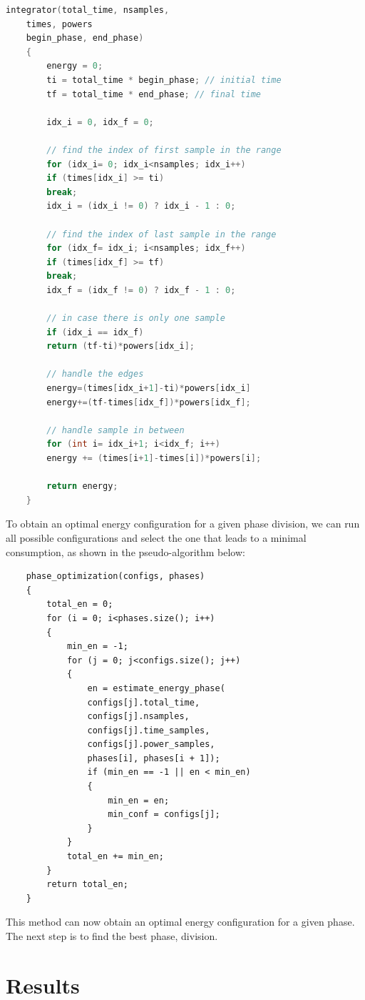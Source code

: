 \begin{lstlisting}[language=c++]
	integrator(total_time, nsamples,
	times, powers
	begin_phase, end_phase)
	{
		energy = 0;
		ti = total_time * begin_phase; // initial time
		tf = total_time * end_phase; // final time
		
		idx_i = 0, idx_f = 0;
		
		// find the index of first sample in the range
		for (idx_i= 0; idx_i<nsamples; idx_i++)
		if (times[idx_i] >= ti)
		break;
		idx_i = (idx_i != 0) ? idx_i - 1 : 0;
		
		// find the index of last sample in the range
		for (idx_f= idx_i; i<nsamples; idx_f++)
		if (times[idx_f] >= tf)
		break;
		idx_f = (idx_f != 0) ? idx_f - 1 : 0;
		
		// in case there is only one sample
		if (idx_i == idx_f) 
		return (tf-ti)*powers[idx_i];
		
		// handle the edges
		energy=(times[idx_i+1]-ti)*powers[idx_i]
		energy+=(tf-times[idx_f])*powers[idx_f];
		
		// handle sample in between
		for (int i= idx_i+1; i<idx_f; i++)
		energy += (times[i+1]-times[i])*powers[i];
		
		return energy;
	}
\end{lstlisting}

To obtain an optimal energy configuration for a given phase division, we can run all possible configurations and select the one that leads to a minimal consumption, as shown in the pseudo-algorithm below:

\begin{lstlisting}
	phase_optimization(configs, phases)
	{
		total_en = 0;
		for (i = 0; i<phases.size(); i++)
		{
			min_en = -1;
			for (j = 0; j<configs.size(); j++)
			{
				en = estimate_energy_phase(
				configs[j].total_time, 
				configs[j].nsamples,
				configs[j].time_samples,
				configs[j].power_samples,
				phases[i], phases[i + 1]);
				if (min_en == -1 || en < min_en)
				{
					min_en = en;
					min_conf = configs[j];
				}
			}
			total_en += min_en;
		}
		return total_en;
	}
\end{lstlisting}

This method can now obtain an optimal energy configuration for a given phase. The next step is to find the best phase, division.

\section{Results} \label{sec:results}

